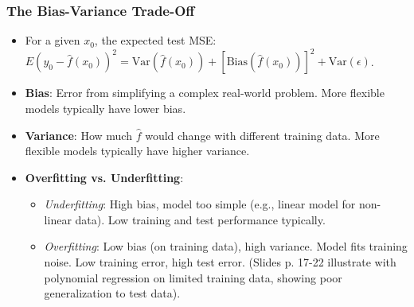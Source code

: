 \documentclass[12pt,a4paper]{article}
\begin{document}
    \subsubsection{The Bias-Variance Trade-Off }
        \begin{itemize}
            \item For a given $x_0$, the expected test MSE: $E(y_0 - \hat{f}(x_0))^2 = \text{Var}(\hat{f}(x_0)) + [\text{Bias}(\hat{f}(x_0))]^2 + \text{Var}(\epsilon)$.
            \item \textbf{Bias}: Error from simplifying a complex real-world problem. More flexible models typically have lower bias.
            \item \textbf{Variance}: How much $\hat{f}$ would change with different training data. More flexible models typically have higher variance.
 
            \item \textbf{Overfitting vs. Underfitting}:
                 \begin{itemize}
                    \item \textit{Underfitting}: High bias, model too simple (e.g., linear model for non-linear data). Low training and test performance typically.
                    \item \textit{Overfitting}: Low bias (on training data), high variance. Model fits training noise. Low training error, high test error. (Slides p. 17-22 illustrate with polynomial regression on limited training data, showing poor generalization to test data).
                 \end{itemize}
        \end{itemize}
\end{document}
